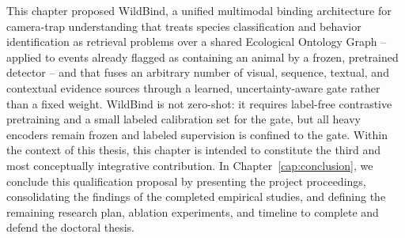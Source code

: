 This chapter proposed WildBind, a unified multimodal binding architecture for camera-trap understanding that treats species classification and behavior identification as retrieval problems over a shared Ecological Ontology Graph -- applied to events already flagged as containing an animal by a frozen, pretrained detector -- and that fuses an arbitrary number of visual, sequence, textual, and contextual evidence sources through a learned, uncertainty-aware gate rather than a fixed weight. WildBind is not zero-shot: it requires label-free contrastive pretraining and a small labeled calibration set for the gate, but all heavy encoders remain frozen and labeled supervision is confined to the gate. Within the context of this thesis, this chapter is intended to constitute the third and most conceptually integrative contribution. In Chapter~\ref{cap:conclusion}, we conclude this qualification proposal by presenting the project proceedings, consolidating the findings of the completed empirical studies, and defining the remaining research plan, ablation experiments, and timeline to complete and defend the doctoral thesis.